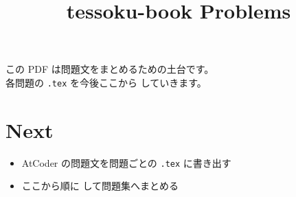 \documentclass[a4paper,12pt]{ltjsarticle}
\title{tessoku-book Problems}
\author{}
\date{}
\begin{document}
\maketitle

この PDF は問題文をまとめるための土台です。\\
各問題の \texttt{.tex} を今後ここから \verb|| していきます。

\section*{Next}

\begin{itemize}[leftmargin=2em]
  \item AtCoder の問題文を問題ごとの \texttt{.tex} に書き出す
  \item ここから順に \verb|| して問題集へまとめる
\end{itemize}
\end{document}
